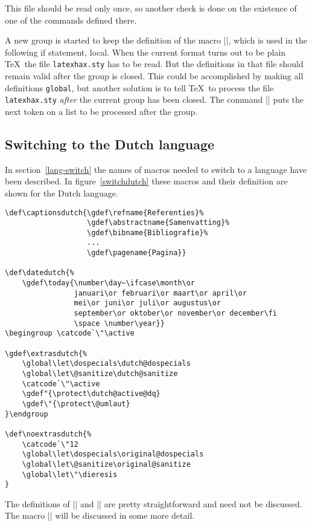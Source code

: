 \documentclass{ltugboat}
\newcommand{\file}[1]{\texttt{#1}}
\begin{document}
This file should be read only once, so another check is done on the
existence of one of the commands defined there.

A new group is started to keep the definition of the macro
|\format|, which is used in the following if statement, local.
When the current format turns out to be plain \TeX\ the file
\file{latexhax.sty} has to be read. But the definitions in that file
should remain valid after the group is closed. This could be
accomplished by making all definitions \texttt{global}, but another
solution is to tell \TeX\ to process the file \file{latexhax.sty}
\emph{after} the current group has been closed. The command
|\aftergroup| puts the next token on a list to be processed after
the group.

\subsection{Switching to the Dutch language}
In section~\ref{lang-switch} the names of macros needed to switch to a
language have been described. In figure~\ref{switchdutch} these macros
and their definition are shown for the Dutch language.
\begin{figure*}[htb]
\begin{verbatim}
\def\captionsdutch{\gdef\refname{Referenties}%
                   \gdef\abstractname{Samenvatting}%
                   \gdef\bibname{Bibliografie}%
                   ...
                   \gdef\pagename{Pagina}}

\def\datedutch{%
    \gdef\today{\number\day~\ifcase\month\or
                januari\or februari\or maart\or april\or
                mei\or juni\or juli\or augustus\or
                september\or oktober\or november\or december\fi
                \space \number\year}}
\begingroup \catcode`\"\active

\gdef\extrasdutch{%
    \global\let\dospecials\dutch@dospecials
    \global\let\@sanitize\dutch@sanitize
    \catcode`\"\active
    \gdef"{\protect\dutch@active@dq}
    \gdef\"{\protect\@umlaut}
}\endgroup

\def\noextrasdutch{%
    \catcode`\"12
    \global\let\dospecials\original@dospecials
    \global\let\@sanitize\original@sanitize
    \global\let\"\dieresis
}
\end{verbatim}
\caption{The macros needed to switch to the Dutch language}
\label{switchdutch}
\end{figure*}

The definitions of |\captionsdutch| and |\datedutch| are pretty
straightforward and need not be discussed. The macro |\extrasdutch|
will be discussed in some more detail.
\end{document}
